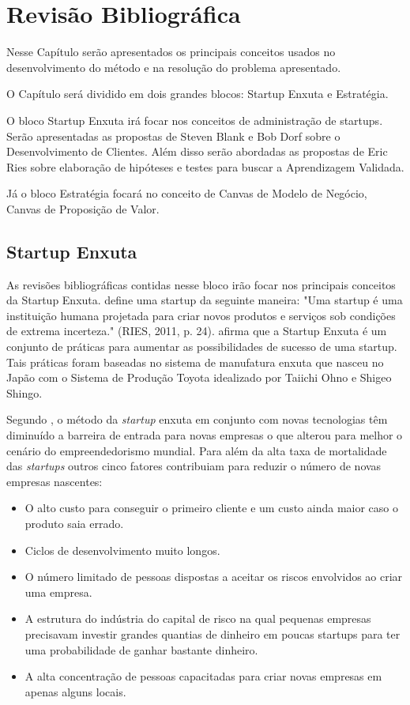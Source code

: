 \chapter[Revisão Bibliográfica]{Revisão Bibliográfica}
\label{chap:revisao}

Nesse Capítulo serão apresentados os principais conceitos usados no desenvolvimento do método e na resolução do problema apresentado.

O Capítulo será dividido em dois grandes blocos: Startup Enxuta e Estratégia.

O bloco Startup Enxuta irá focar nos conceitos de administração de startups. Serão apresentadas as propostas de Steven Blank e Bob Dorf sobre o Desenvolvimento de Clientes. Além disso serão abordadas as propostas de Eric Ries sobre elaboração de hipóteses e testes para buscar a Aprendizagem Validada.

Já o bloco Estratégia focará no conceito de Canvas de Modelo de Negócio, Canvas de Proposição de Valor.

\section{Startup Enxuta}
\label{cha:startupenxuta}
As revisões bibliográficas contidas nesse bloco irão focar nos principais conceitos da Startup Enxuta.  define uma startup da seguinte maneira: "Uma startup é uma instituição humana projetada para criar novos produtos e serviços sob condições de extrema incerteza." (RIES, 2011, p. 24).  afirma que a Startup Enxuta é um conjunto de práticas para aumentar as possibilidades de sucesso de uma startup. Tais práticas foram baseadas no sistema de manufatura enxuta que nasceu no Japão com o Sistema de Produção Toyota idealizado por Taiichi Ohno e Shigeo Shingo.

Segundo , o método da \textit{startup} enxuta em conjunto com novas tecnologias têm diminuído a barreira de entrada para novas empresas o que alterou para melhor o cenário do empreendedorismo mundial. Para  além da alta taxa de mortalidade das \textit{startups} outros cinco fatores contribuiam para reduzir o número de novas empresas nascentes:
\begin{itemize}
\item O alto custo para conseguir o primeiro cliente e um custo ainda maior caso o produto saia errado.
\item Ciclos de desenvolvimento muito longos.
\item O número limitado de pessoas dispostas a aceitar os riscos envolvidos ao criar uma empresa.
\item A estrutura do indústria do capital de risco na qual pequenas empresas precisavam investir grandes quantias de dinheiro em poucas startups para ter uma probabilidade de ganhar bastante dinheiro.
\item A alta concentração de pessoas capacitadas para criar novas empresas em apenas alguns locais.
\end{itemize} 

